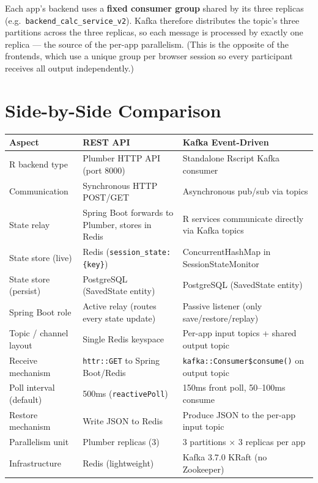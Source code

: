 \documentclass[12pt,a4paper]{article}
\begin{document}
Each app's backend uses a \textbf{fixed consumer group} shared by its three replicas (e.g.\ \texttt{backend\_calc\_service\_v2}). Kafka therefore distributes the topic's three partitions across the three replicas, so each message is processed by exactly one replica --- the source of the per-app parallelism. (This is the opposite of the frontends, which use a unique group per browser session so every participant receives all output independently.)

\section{Side-by-Side Comparison}

\begin{table}[h]
\centering
\small
\begin{tabular}{@{}p{3.5cm}p{5.5cm}p{5.5cm}@{}}
\toprule
\textbf{Aspect} & \textbf{REST API} & \textbf{Kafka Event-Driven} \\
\midrule
R backend type & Plumber HTTP API (port 8000) & Standalone Rscript Kafka consumer \\
Communication & Synchronous HTTP POST/GET & Asynchronous pub/sub via topics \\
State relay & Spring Boot forwards to Plumber, stores in Redis & R services communicate directly via Kafka topics \\
State store (live) & Redis (\texttt{session\_state:\{key\}}) & ConcurrentHashMap in SessionStateMonitor \\
State store (persist) & PostgreSQL (SavedState entity) & PostgreSQL (SavedState entity) \\
Spring Boot role & Active relay (routes every state update) & Passive listener (only save/restore/replay) \\
Topic / channel layout & Single Redis keyspace & Per-app input topics + shared output topic \\
Receive mechanism & \texttt{httr::GET} to Spring Boot/Redis & \texttt{kafka::Consumer\$consume()} on output topic \\
Poll interval (default) & 500ms (\texttt{reactivePoll}) & 150ms front poll, 50--100ms consume \\
Restore mechanism & Write JSON to Redis & Produce JSON to the per-app input topic \\
Parallelism unit & Plumber replicas (3) & 3 partitions $\times$ 3 replicas per app \\
Infrastructure & Redis (lightweight) & Kafka 3.7.0 KRaft (no Zookeeper) \\

\end{tabular}
\end{table}
\end{document}
